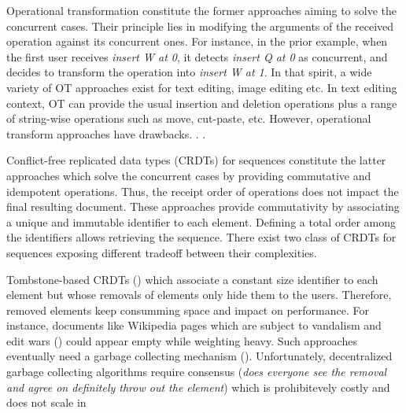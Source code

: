 \begin{asparadesc}

\item [Operational transformation] constitute the former approaches aiming to
  solve the concurrent cases. Their principle lies in modifying the arguments of
  the received operation against its concurrent ones. For instance, in the prior
  example, when the first user receives \emph{insert W at 0}, it detects
  \emph{insert Q at 0} as concurrent, and decides to transform the operation
  into \emph{insert W at 1}.  In that spirit, a wide variety of OT approaches
  exist for text editing, image editing etc. In text editing context, OT can
  provide the usual insertion and deletion operations plus a range of
  string-wise operations such as move, cut-paste, etc. However, operational
  transform approaches have drawbacks. . .
\item [Conflict-free replicated data types] (CRDTs) for sequences constitute the
  latter approaches which solve the concurrent cases by providing commutative
  and idempotent operations. Thus, the receipt order of operations does not
  impact the final resulting document. These approaches provide commutativity by
  associating a unique and immutable identifier to each element. Defining a
  total order among the identifiers allows retrieving the sequence. There exist
  two class of CRDTs for sequences exposing different tradeoff between their
  complexities.
\item [Tombstone-based] CRDTs () which associate a constant size
  identifier to each element but whose removals of elements only hide them to
  the users. Therefore, removed elements keep consumming space and impact on
  performance. For instance, documents like Wikipedia pages which are subject to
  vandalism and edit wars () could appear empty while weighting
  heavy. Such approaches eventually need a garbage collecting mechanism
  ().  Unfortunately, decentralized garbage collecting algorithms
  require consensus (\emph{does everyone see the removal and agree on definitely
    throw out the element}) which is prohibitevely costly and does not scale in

\end{asparadesc}

